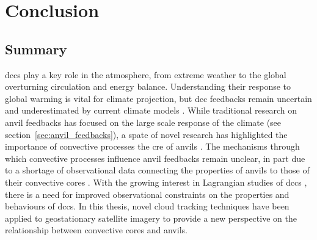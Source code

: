 \chapter{Conclusion} \label{chp:conclusion}

\section{Summary}

\acrshort{dcc}s play a key role in the atmosphere, from extreme weather to the global overturning circulation and energy balance.
Understanding their response to global warming is vital for climate projection, but \acrshort{dcc} feedbacks remain uncertain \citep{sherwood_assessment_2020} and underestimated by current climate models \citep{hill_climate_2023}.
While traditional research on anvil feedbacks has focused on the large scale response of the climate (see section~\ref{sec:anvil_feedbacks}), a spate of novel research has highlighted the importance of convective processes the \acrshort{cre} of anvils \citep{raghuraman_observational_2024, sokol_greater_2024, mckim_weak_2024}.
The mechanisms through which convective processes influence anvil feedbacks remain unclear, in part due to a shortage of observational data connecting the properties of anvils to those of their convective cores \citep{gasparini_opinion_2023}.
With the growing interest in Lagrangian studies of \acrshort{dcc}s \citep{gasparini_what_2019, sokol_tropical_2020, bouniol_life_2021}, there is a need for improved observational constraints on the properties and behaviours of \acrshort{dcc}s.
In this thesis, novel cloud tracking techniques have been applied to geostationary satellite imagery to provide a new perspective on the relationship between convective cores and anvils.




% 


